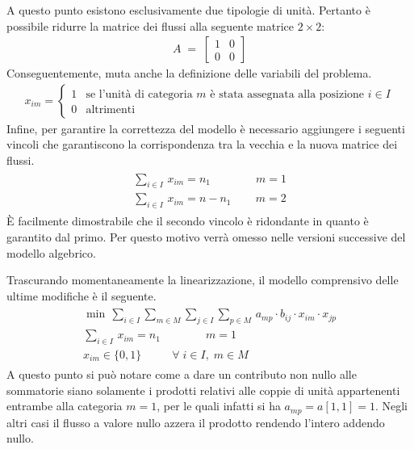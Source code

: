\newpage \noindent
A questo punto esistono esclusivamente due tipologie di unità. Pertanto è possibile ridurre la matrice dei flussi alla seguente 
matrice $2\times 2$:
\begin{align*}
    A \; = \;
    \begin{bmatrix}
        1 & 0 \\
        0 & 0
    \end{bmatrix}
\end{align*}
Conseguentemente, muta anche la definizione delle variabili del problema.
\begin{align*}
    x_{im} = \begin{cases}  1 & \mbox{se l'unità di categoria } m \mbox{ è stata assegnata alla posizione } i \in I\\ 0 & \mbox{altrimenti} \end{cases}
\end{align*}
Infine, per garantire la correttezza del modello è necessario aggiungere i seguenti vincoli che garantiscono la corrispondenza tra 
la vecchia e la nuova matrice dei flussi.
\begin{align*}
    \begin{array}{l}
        \sum_{i\in I} \, x_{im} = n_1    \qquad\qquad m=1\\
        \sum_{i\in I} \, x_{im} = n-n_1  \,\qquad m=2
    \end{array}
\end{align*}
È facilmente dimostrabile che il secondo vincolo è ridondante in quanto è garantito dal primo. Per questo motivo verrà omesso nelle 
versioni successive del modello algebrico.

\noindent
Trascurando momentaneamente la linearizzazione, il modello comprensivo delle ultime modifiche è il seguente.
\begin{align*}
	\begin{array}{l}
      \min \, \sum_{i\in I} \sum_{m\in M} \sum_{j\in I} \sum_{p\in M} \, a_{mp}\cdot b_{ij}\cdot x_{im}\cdot x_{jp} \\
      \sum_{i\in I} \, x_{im} = n_1    \qquad\qquad m=1\\
      x_{im} \in \{0,1\}           \;\;\,\qquad \forall \; i \in I ,\; m \in M
    \end{array}
\end{align*}
A questo punto si può notare come a dare un contributo non nullo alle sommatorie siano solamente i prodotti relativi alle 
coppie di unità appartenenti entrambe alla categoria $m=1$, per le quali infatti si ha $a_{mp}=a[1,1]=1$. Negli altri casi il flusso 
a valore nullo azzera il prodotto rendendo l'intero addendo nullo. 

